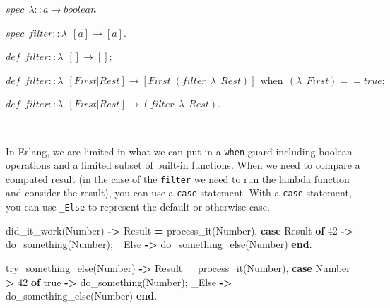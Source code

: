 \documentclass[
]{book}
\newenvironment{Shaded}{\begin{snugshade}}{\end{snugshade}}
\newcommand{\CharTok}[1]{\textcolor[rgb]{0.31,0.60,0.02}{#1}}
\newcommand{\DecValTok}[1]{\textcolor[rgb]{0.00,0.00,0.81}{#1}}
\newcommand{\FunctionTok}[1]{\textcolor[rgb]{0.00,0.00,0.00}{#1}}
\newcommand{\KeywordTok}[1]{\textcolor[rgb]{0.13,0.29,0.53}{\textbf{#1}}}
\newcommand{\OperatorTok}[1]{\textcolor[rgb]{0.81,0.36,0.00}{\textbf{#1}}}
\newcommand{\VariableTok}[1]{\textcolor[rgb]{0.00,0.00,0.00}{#1}}
\begin{document}
\begin{formulabox}
\(spec ~ ~ \lambda :: a \rightarrow boolean\)

\(spec ~ ~ \mathit{filter} :: \lambda ~ ~ [a] \rightarrow [a].\)

\(de\mathit{f} ~ ~ \mathit{filter} :: \lambda ~ ~ [] \rightarrow [];\)

\(de\mathit{f} ~ ~ \mathit{filter} :: \lambda ~ ~ [First | Rest] \rightarrow [First|(\mathit{filter} ~ ~ \lambda ~ ~ Rest)] ~ ~ \text{when} ~ ~ (\lambda ~ ~ First) == true;\)

\(de\mathit{f} ~ ~ \mathit{filter} :: \lambda ~ ~ [First | Rest] \rightarrow (\mathit{filter} ~ ~ \lambda ~ ~ Rest).\)

\end{formulabox}

\(\nonumber\)

In Erlang, we are limited in what we can put in a \texttt{when} guard including boolean operations and a limited subset of built-in functions. When we need to compare a computed result (in the case of the \texttt{filter} we need to run the lambda function and consider the result), you can use a \texttt{case} statement. With a \texttt{case} statement, you can use \texttt{\_Else} to represent the default or otherwise case.

\begin{Shaded}
\begin{Highlighting}[]
\FunctionTok{did\_it\_work(}\VariableTok{Number}\FunctionTok{)} \OperatorTok{{-}\textgreater{}}
   \VariableTok{Result} \OperatorTok{=} \FunctionTok{process\_it(}\VariableTok{Number}\FunctionTok{),}
   \KeywordTok{case} \VariableTok{Result} \KeywordTok{of}
      \DecValTok{42} \OperatorTok{{-}\textgreater{}} \FunctionTok{do\_something(}\VariableTok{Number}\FunctionTok{);}
      \VariableTok{\_Else} \OperatorTok{{-}\textgreater{}} \FunctionTok{do\_something\_else(}\VariableTok{Number}\FunctionTok{)}
   \KeywordTok{end}\FunctionTok{.}

\FunctionTok{try\_something\_else(}\VariableTok{Number}\FunctionTok{)} \OperatorTok{{-}\textgreater{}}
   \VariableTok{Result} \OperatorTok{=} \FunctionTok{process\_it(}\VariableTok{Number}\FunctionTok{),}
   \KeywordTok{case} \VariableTok{Number} \OperatorTok{\textgreater{}} \DecValTok{42} \KeywordTok{of}
      \CharTok{true} \OperatorTok{{-}\textgreater{}} \FunctionTok{do\_something(}\VariableTok{Number}\FunctionTok{);}
      \VariableTok{\_Else} \OperatorTok{{-}\textgreater{}} \FunctionTok{do\_something\_else(}\VariableTok{Number}\FunctionTok{)}
   \KeywordTok{end}\FunctionTok{.}
\end{Highlighting}
\end{Shaded}
\end{document}
